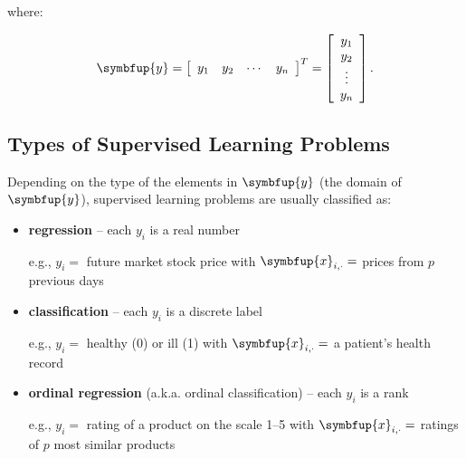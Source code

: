 \documentclass[10pt,b5paper,krantz1]{krantz}
\renewcommand{\mathbf}[1]{\symbfup{#1}}
\begin{document}
where:

\[
\mathbf{y} = \left[
\begin{array}{cccc}
y_{1} &
y_{2} &
\cdots &
y_{n} \\
\end{array}
\right]^T=\left[
\begin{array}{c}
{y}_{1} \\
{y}_{2} \\
\vdots\\
{y}_{n} \\
\end{array}
\right].
\]

\hypertarget{types-of-supervised-learning-problems}{%
\subsection{Types of Supervised Learning Problems}\label{types-of-supervised-learning-problems}}

Depending on the type of the elements in \(\mathbf{y}\)
(the domain of \(\mathbf{y}\)),
supervised learning problems are usually
classified as:

\begin{itemize}
\item
  \textbf{regression} -- each \(y_i\) is a real number

  e.g., \(y_i=\) future market stock price
  with \(\mathbf{x}_{i,\cdot}=\) prices from \(p\) previous days
\item
  \textbf{classification} -- each \(y_i\) is a discrete label

  e.g., \(y_i=\) healthy (0) or ill (1)
  with \(\mathbf{x}_{i,\cdot}=\) a patient's health record
\item
  \textbf{ordinal regression} (a.k.a. ordinal classification) -- each \(y_i\) is a rank

  e.g., \(y_i=\) rating of a product on the scale 1--5
  with \(\mathbf{x}_{i,\cdot}=\) ratings of \(p\) most similar products
\end{itemize}
\end{document}

